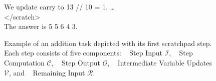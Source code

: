 {\begin{figure}
{\begin{minipage}{\linewidth}
\begin{framed}
{{                        We update carry to 13 // 10 = 1.
                    }
                    \vspace{0.5mm}
                    \vspace{0.5em}
                    \dots
                    \vspace{0.5em}
                    \\
                    </scratch> \\
                    The answer is 5 5 6 4 3.

                    }
                \end{framed}
                \caption{Example of an addition task depicted with its first scratchpad step.
                    Each step consists of five components:
                    \  Step Input $\mathcal{I}$,
                    \  Step Computation $\mathcal{C}$,
                    \  Step Output $\mathcal{O}$,
                    \  Intermediate Variable Updates  $\mathcal{V}$,
                    and \  Remaining Input $\mathcal{R}$.
                }
                \label{fig:unified_scratchpad_format}
            \end{minipage}
        }
    \end{figure}
}